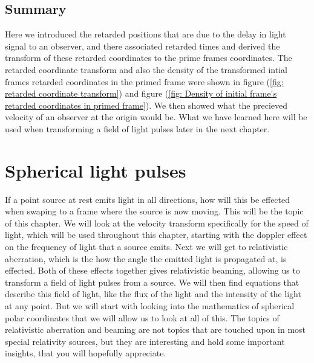

\section{Summary}

Here we introduced the retarded positions that are due to the delay in light signal to an observer, and there associated retarded times and derived the transform of these retarded coordinates to the prime frames coordinates.
The retarded coordinate transform and also the density of the transformed intial frames retarded coordinates in the primed frame were shown in figure (\ref{fig: retarded coordinate transform}) and figure (\ref{fig: Density of initial frame's retarded coordinates in primed frame}).
We then showed what the precieved velocity of an observer at the origin would be.
What we have learned here will be used when transforming a field of light pulses later in the next chapter.



\printbibliography[segment=\therefsegment, heading=subbibliography]


\chapter{Spherical light pulses} \label{ch: Spherical light pulses}

If a point source at rest emits light in all directions, how will this be effected when swaping to a frame where the source is now moving.
This will be the topic of this chapter.
We will look at the velocity transform specifically for the speed of light, which will be used throughout this chapter, starting with the doppler effect on the frequency of light that a source emits.
Next we will get to relativistic aberration, which is the how the angle the emitted light is propagated at, is effected.
Both of these effects together gives relativistic beaming, allowing us to transform a field of light pulses from a source.
We will then find equations that describe this field of light, like the flux of the light and the intensity of the light at any point.
But we will start with looking into the mathematics of spherical polar coordinates that we will allow us to look at all of this.
The topics of relativistic aberration and beaming are not topics that are touched upon in most special relativity sources, but they are interesting and hold some important insights, that you will hopefully appreciate.

